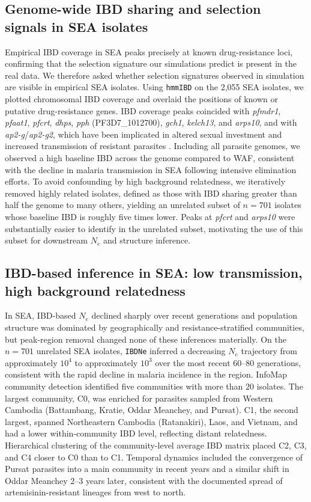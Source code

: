 \documentclass[11pt]{article}
\begin{document}
\subsection{Genome-wide IBD sharing and selection signals in SEA isolates}

Empirical IBD coverage in SEA peaks precisely at known drug-resistance loci, confirming that the selection signature our simulations predict is present in the real data. We therefore asked whether selection signatures observed in simulation are visible in empirical SEA isolates. Using \texttt{hmmIBD} on the 2,055 SEA isolates, we plotted chromosomal IBD coverage and overlaid the positions of known or putative drug-resistance genes. IBD coverage peaks coincided with \textit{pfmdr1}, \textit{pfaat1}, \textit{pfcrt}, \textit{dhps}, \textit{pph} (PF3D7\_1012700), \textit{gch1}, \textit{kelch13}, and \textit{arps10}, and with \textit{ap2-g}/\textit{ap2-g2}, which have been implicated in altered sexual investment and increased transmission of resistant parasites \citep{ariey2014kelch13,fidock2000pfcrt,miotto2015genetic}. Including all parasite genomes, we observed a high baseline IBD across the genome compared to WAF, consistent with the decline in malaria transmission in SEA following intensive elimination efforts. To avoid confounding by high background relatedness, we iteratively removed highly related isolates, defined as those with IBD sharing greater than half the genome to many others, yielding an unrelated subset of $n = 701$ isolates whose baseline IBD is roughly five times lower. Peaks at \textit{pfcrt} and \textit{arps10} were substantially easier to identify in the unrelated subset, motivating the use of this subset for downstream $N_e$ and structure inference.

\subsection{IBD-based inference in SEA: low transmission, high background relatedness}

In SEA, IBD-based $N_e$ declined sharply over recent generations and population structure was dominated by geographically and resistance-stratified communities, but peak-region removal changed none of these inferences materially. On the $n = 701$ unrelated SEA isolates, \texttt{IBDNe} inferred a decreasing $N_e$ trajectory from approximately $10^4$ to approximately $10^3$ over the most recent $60$--$80$ generations, consistent with the rapid decline in malaria incidence in the region. InfoMap community detection identified five communities with more than $20$ isolates. The largest community, C0, was enriched for parasites sampled from Western Cambodia (Battambang, Kratie, Oddar Meanchey, and Pursat). C1, the second largest, spanned Northeastern Cambodia (Ratanakiri), Laos, and Vietnam, and had a lower within-community IBD level, reflecting distant relatedness. Hierarchical clustering of the community-level average IBD matrix placed C2, C3, and C4 closer to C0 than to C1. Temporal dynamics included the convergence of Pursat parasites into a main community in recent years and a similar shift in Oddar Meanchey $2$--$3$ years later, consistent with the documented spread of artemisinin-resistant lineages from west to north.
\end{document}
